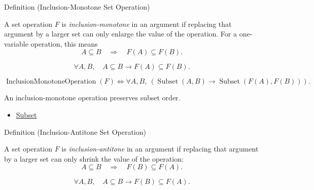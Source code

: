 \begin{definitionbox}{Definition (Inclusion-Monotone Set Operation)}
\begin{definition}\label{def:inclusion-monotone-set-operation}
A set operation $F$ is \emph{inclusion-monotone} in an argument if replacing
that argument by a larger set can only enlarge the value of the operation.
For a one-variable operation, this means
\[
A\subseteq B \quad\Longrightarrow\quad F(A)\subseteq F(B).
\]
\end{definition}
\end{definitionbox}

\begin{remark*}
\[
  \forall A,B,\quad A\subseteq B \to F(A)\subseteq F(B).
\]
\end{remark*}

\begin{remark*}
\[
  \operatorname{InclusionMonotoneOperation}(F)
  \iff
  \forall A,B,\ (\operatorname{Subset}(A,B)\to \operatorname{Subset}(F(A),F(B))).
\]
\end{remark*}

\begin{remark*}[Interpretation]
An inclusion-monotone operation preserves subset order.
\end{remark*}

\begin{dependencies}
\begin{itemize}
  \item \hyperref[def:subset]{Subset}
\end{itemize}
\end{dependencies}

\begin{definitionbox}{Definition (Inclusion-Antitone Set Operation)}
\begin{definition}\label{def:inclusion-antitone-set-operation}
A set operation $F$ is \emph{inclusion-antitone} in an argument if replacing
that argument by a larger set can only shrink the value of the operation:
\[
A\subseteq B \quad\Longrightarrow\quad F(B)\subseteq F(A).
\]
\end{definition}
\end{definitionbox}

\begin{remark*}
\[
  \forall A,B,\quad A\subseteq B \to F(B)\subseteq F(A).
\]
\end{remark*}

